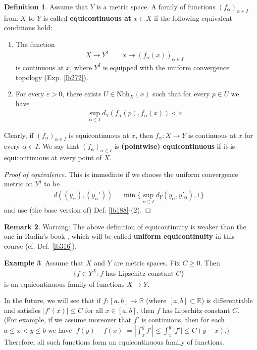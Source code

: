 \documentclass[12pt,b5paper,notitlepage]{article}
\theoremstyle{definition}
\newtheorem{df}{Definition}[section]
\newtheorem{eg}[df]{Example}
\newtheorem{rem}[df]{Remark}
\theoremstyle{plain}
\newcommand{\Rbb}{\mathbb R}
\newcommand{\Nbh}{\mathrm{Nbh}}
\newcommand{\eps}{\varepsilon}
\numberwithin{equation}{section}
\begin{document}
\begin{df}
Assume that $Y$ is a metric space. A family of functions $(f_\alpha)_{\alpha\in I}$ from $X$ to $Y$ is called \textbf{equicontinuous at} $x\in X$  if the following equivalent conditions hold:
\begin{enumerate}[label=(\arabic*)]
\item The function
\begin{gather}
X\rightarrow Y^{I}\qquad x\mapsto (f_\alpha(x))_{\alpha\in I}
\end{gather}
is continuous at $x$, where $Y^{I}$ is equipped with the uniform convergence topology (Exp. \ref{lb272}).
\item For every $\eps>0$, there exists $U\in\Nbh_X(x)$ such that for every $p\in U$ we have
\begin{align*}
\sup_{\alpha\in I}d_Y(f_\alpha(p),f_\alpha(x))<\eps
\end{align*}
\end{enumerate}
Clearly, if $(f_\alpha)_{\alpha\in I}$ is equicontinuous at $x$, then $f_\alpha:X\rightarrow Y$ is continuous at $x$ for every $\alpha\in I$. We say that $(f_\alpha)_{\alpha\in I}$ is \textbf{(pointwise) equicontinuous}  if it is equicontinuous at every point of $X$.
\end{df}



\begin{proof}[Proof of equivalence]
This is immediate if we choose the uniform convergence metric on $Y^I$ to be
\begin{align*}
d((y_\alpha),(y_\alpha'))=\min\Big\{\sup_{\alpha\in I}d_Y(y_\alpha,y'_\alpha),1\Big\}
\end{align*}
and use (the base version of) Def. \ref{lb188}-(2).
\end{proof}

\begin{rem}
Warning: The above definition of equicontinuity is weaker than the one in Rudin's book \cite[Ch. 7]{Rud-P}, which will be called \textbf{uniform equicontinuity} in this course (cf. Def. \ref{lb316}).
\end{rem}



\begin{eg}\label{lb309}
Assume that $X$ and $Y$ are metric spaces. Fix $C\geq 0$. Then
\begin{align*}
\{f\in Y^X:f\text{ has Lipschitz constant }C\}
\end{align*}
is an equicontinuous family of functions $X\rightarrow Y$.

In the future, we will see that if $f:[a,b]\rightarrow\Rbb$ (where $[a,b]\subset\Rbb$) is differentiable and satisfies $|f'(x)|\leq C$ for all $x\in[a,b]$, then $f$ has Lipschitz constant $C$. (For example, if we assume moreover that $f'$ is continuous, then for each $a\leq x<y\leq b$ we have $|f(y)-f(x)|=|\int_x^y f'|\leq \int_x^y|f'|\leq C(y-x)$.) Therefore, all such functions form an equicontinuous family of functions.  \hfill\qedsymbol
\end{eg}
\end{document}
